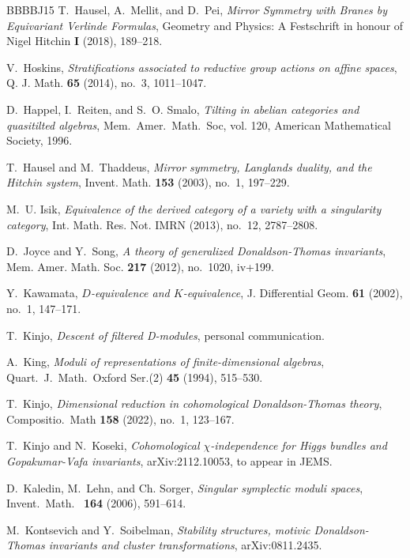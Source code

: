 \documentclass [11pt,oneside,a4paper,mathscr]{amsart}
\theoremstyle{definition}
\begin{document}
\begin{thebibliography}{BBBBJ15}
T.~Hausel, A.~Mellit, and D.~Pei, \emph{Mirror {S}ymmetry with {B}ranes by {E}quivariant {V}erlinde {F}ormulas}, Geometry and Physics: A Festschrift in honour of Nigel Hitchin \textbf{I} (2018), 189--218.

V.~Hoskins, \emph{Stratifications associated to reductive group actions on affine spaces}, Q. J. Math. \textbf{65} (2014), no.~3, 1011--1047.

D.~Happel, I.~Reiten, and S.~O. Smalo, \emph{Tilting in abelian categories and quasitilted algebras}, Mem.~Amer.~Math.~Soc, vol. 120, American Mathematical Society, 1996.

T.~Hausel and M.~Thaddeus, \emph{Mirror symmetry, {L}anglands duality, and the {H}itchin system}, Invent. Math. \textbf{153} (2003), no.~1, 197--229.

M.~U. Isik, \emph{Equivalence of the derived category of a variety with a singularity category}, Int. Math. Res. Not. IMRN (2013), no.~12, 2787--2808.

D.~Joyce and Y.~Song, \emph{A theory of generalized {D}onaldson-{T}homas invariants}, Mem. Amer. Math. Soc. \textbf{217} (2012), no.~1020, iv+199.

Y.~Kawamata, \emph{{$D$}-equivalence and {$K$}-equivalence}, J. Differential Geom. \textbf{61} (2002), no.~1, 147--171.

T.~Kinjo, \emph{Descent of filtered {D}-modules}, personal communication.

A.~King, \emph{Moduli of representations of finite-dimensional algebras}, Quart.~J.~Math.~Oxford Ser.(2) \textbf{45} (1994), 515--530.

T.~Kinjo, \emph{Dimensional reduction in cohomological {D}onaldson-{T}homas theory}, Compositio.~Math \textbf{158} (2022), no.~1, 123--167.

T.~Kinjo and N.~Koseki, \emph{Cohomological $\chi$-independence for {H}iggs bundles and {G}opakumar-{V}afa invariants}, arXiv:2112.10053, to appear in JEMS.

D.~Kaledin, M.~Lehn, and Ch. Sorger, \emph{Singular symplectic moduli spaces}, Invent.~Math.~ \textbf{164} (2006), 591--614.

M.~Kontsevich and Y.~Soibelman, \emph{Stability structures, motivic {D}onaldson-{T}homas invariants and cluster transformations}, arXiv:0811.2435.


\end{thebibliography}
\end{document}
